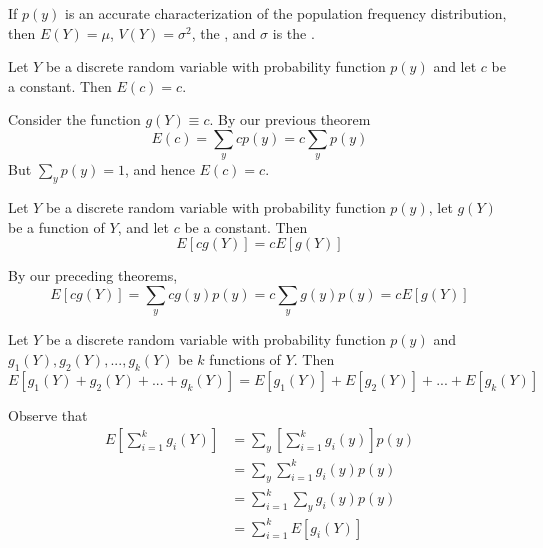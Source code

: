 \documentclass[12pt, a4paper, twoside, openright, titlepage]{book}
\begin{document}
\begin{rmk}{}{}
    If $p(y)$ is an accurate characterization of the population frequency distribution, then $E(Y) = \mu$, $V(Y) = \sigma^2$, the , and $\sigma$ is the .
\end{rmk}

\begin{thm}{}{}
    Let $Y$ be a discrete random variable with probability function $p(y)$ and let $c$ be a constant. Then $E(c) = c$.
\end{thm}
\begin{proof*}{}{}
    Consider the function $g(Y) \equiv c$. By our previous theorem \begin{equation*}
        E(c) = \sum_ycp(y) = c\sum_yp(y)
    \end{equation*}
    But $\sum_yp(y) = 1$, and hence $E(c) = c$.
\end{proof*}


\begin{thm}{}{}
    Let $Y$ be a discrete random variable with probability function $p(y)$, let $g(Y)$ be a function of $Y$, and let $c$ be a constant. Then \begin{equation*}
        E[cg(Y)] = cE[g(Y)]
    \end{equation*}
\end{thm}
\begin{proof*}{}{}
    By our preceding theorems, \begin{equation*}
        E[cg(Y)] = \sum_ycg(y)p(y) = c\sum_yg(y)p(y) = cE[g(Y)]
    \end{equation*}
\end{proof*}


\begin{thm}{}{}
    Let $Y$ be a discrete random variable with probability function $p(y)$ and $g_1(Y), g_2(Y),...,g_k(Y)$ be $k$ functions of $Y$. Then \begin{equation*}
        E[g_1(Y)+g_2(Y) + ... + g_k(Y)] = E[g_1(Y)] + E[g_2(Y)] + ... + E[g_k(Y)]
    \end{equation*}
\end{thm}
\begin{proof*}{}{}
    Observe that \begin{align*}
        E\left[\sum\limits_{i=1}^kg_i(Y)\right] &= \sum\limits_y\left[\sum\limits_{i=1}^kg_i(y)\right]p(y) \\
        &=\sum\limits_y\sum\limits_{i=1}^kg_i(y)p(y) \\
        &=\sum\limits_{i=1}^k\sum\limits_yg_i(y)p(y) \\
        &= \sum\limits_{i=1}^kE[g_i(Y)]
    \end{align*}
\end{proof*}
\end{document}
